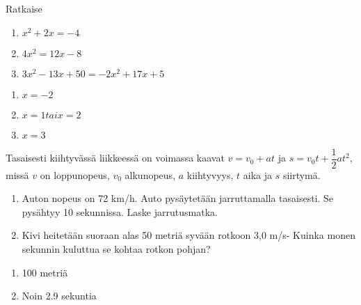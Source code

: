 \begin{tehtava}
    Ratkaise
    \begin{enumerate}
        \item $x^2 + 2x = -4$
        \item $4x^2 = 12x - 8$
        \item $3x^2 - 13x + 50 = -2x^2 + 17x + 5$
    \end{enumerate}
    \begin{vastaus}
        \begin{enumerate}
            \item $x = -2$
            \item $x = 1 tai x = 2$
            \item $x = 3$
        \end{enumerate}
    \end{vastaus}
\end{tehtava}

\begin{tehtava}
    Tasaisesti kiihtyvässä liikkeessä on voimassa kaavat $v = v_0 + at$ ja $s = v_0t + \dfrac{1}{2}at^2$, missä $v$ on loppunopeus, $v_0$ alkunopeus, $a$ kiihtyvyys, $t$ aika ja $s$ siirtymä. 
		\begin{enumerate}
            \item Auton nopeus on 72 km/h. Auto pysäytetään jarruttamalla tasaisesti. Se pysähtyy 10 sekunnissa. Laske jarrutusmatka.
            \item Kivi heitetään suoraan alas 50 metriä syvään rotkoon 3,0 m/s- Kuinka monen sekunnin kuluttua se kohtaa rotkon pohjan?
        \end{enumerate}
    \begin{vastaus}
        \begin{enumerate}
            \item 100 metriä
            \item Noin 2.9 sekuntia
        \end{enumerate}
    \end{vastaus}
\end{tehtava}